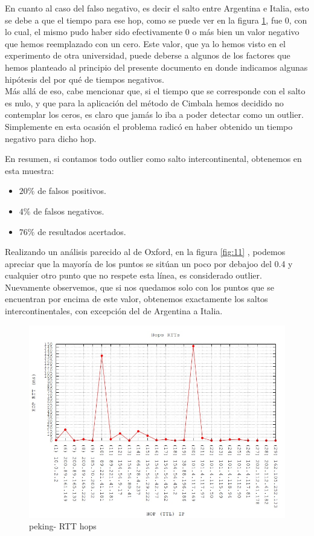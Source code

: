 En cuanto al caso del falso negativo, es decir el salto entre Argentina e Italia, esto se debe a que el tiempo para ese hop, como se puede ver en la figura \ref{fig:10}, fue 0, con lo cual, el mismo pudo haber sido efectivamente 0 o más bien un valor negativo que hemos reemplazado con un cero. Este valor, que ya lo hemos visto en el experimento de otra universidad, puede deberse a algunos de los factores que hemos planteado al principio del presente documento en donde indicamos algunas hipótesis del por qué de tiempos negativos. \\
Más allá de eso, cabe mencionar que, si el tiempo que se corresponde con el salto es nulo, y que para la aplicación del método de Cimbala hemos decidido no contemplar los ceros, es claro que jamás lo iba a poder detectar como un outlier. Simplemente en esta ocasión el problema radicó en haber obtenido un tiempo negativo para dicho hop.

En resumen, si contamos todo outlier como salto intercontinental, obtenemos en esta muestra:

\begin{itemize}
	\item $20 \% $ de falsos positivos.
	\item $4 \%$ de falsos negativos.
	\item $76 \%$ de resultados acertados.
\end{itemize}

Realizando un análisis parecido al de Oxford, en la figura \ref{fig:11} , podemos apreciar que la mayoría de los puntos se sitúan un poco por debajoo del 0.4 y cualquier otro punto que no respete esta línea, es considerado outlier. Nuevamente observemos, que si nos quedamos solo con los puntos que se encuentran por encima de este valor, obtenemos exactamente los saltos intercontinentales, con excepción del de Argentina a Italia. 

\begin{figure}[!htbp]
  \centering
    \includegraphics[scale=0.5]{imagenes/peking-graficos/traceroute-peking.jpg}
  \caption{peking- RTT hops}
  \label{fig:10}
\end{figure}


